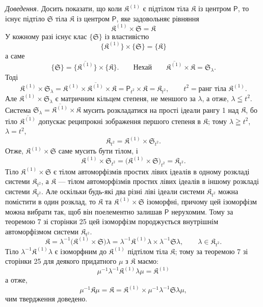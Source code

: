 \documentclass[11pt]{article}
\begin{document}
\emph{Доведення.} Досить показати, що коли \(\mathfrak K^{(1)}\) є підтілом тіла \(\mathfrak K\) із центром \(\mathsf P\), то існує підтіло \(\mathfrak S\) тіла \(\mathfrak K\) із центром \(\mathsf P\), яке задовольняє рівняння
\[
\mathfrak K^{(1)}\times\mathfrak S=\mathfrak K
\]
У кожному разі існує клас \(\{\mathfrak S\}\) із властивістю
\[
\{\mathfrak K^{(1)}\}\times\{\mathfrak S\}=\{\mathfrak K\}
\]
а саме
\[
\{\mathfrak S\}=\{\overline{\mathfrak K^{(1)}}\}\times\{\mathfrak K\}.
\qquad
\text{Нехай}\qquad
\overline{\mathfrak K^{(1)}}\times\mathfrak K=\mathfrak S_\lambda.
\]
Тоді
\[
\mathfrak K^{(1)}\times\mathfrak S_\lambda
=\mathfrak K^{(1)}\times\overline{\mathfrak K^{(1)}}\times\mathfrak K
=\mathsf P_{t^2}\times\mathfrak K
=\mathfrak K_{t^2},
\qquad
t^2=\text{ранг тіла }\mathfrak K^{(1)}.
\]
Але \(\mathfrak K^{(1)}\times\mathfrak S_\lambda\) є матричним кільцем степеня, не меншого за \(\lambda\), а отже, \(\lambda\leqq t^2\). Система \(\mathfrak S_\lambda=\overline{\mathfrak K^{(1)}}\times\mathfrak K\) мусить розкладатися на прості ідеали рангу 1 над \(\mathfrak K\), бо тіло \(\overline{\mathfrak K^{(1)}}\) допускає реципрокні зображення першого степеня в \(\mathfrak K\); тому \(\lambda\geqq t^2\), \(\lambda=t^2\),
\[
\mathfrak K_{t^2}=\mathfrak K^{(1)}\times\mathfrak S_{t^2}.
\]
Отже, \(\mathfrak K^{(1)}\times\mathfrak S\) саме мусить бути тілом, і
\[
\mathfrak K^{(1)}\times\mathfrak S_{t^2}
=\bigl(\mathfrak K^{(1)}\times\mathfrak S\bigr)_{t^2}
=\mathfrak K_{t^2}.
\]
Тіло \(\mathfrak K^{(1)}\times\mathfrak S\) є тілом автоморфізмів простих лівих ідеалів в одному розкладі системи \(\mathfrak K_{t^2}\), а \(\mathfrak K\) --- тілом автоморфізмів простих лівих ідеалів в іншому розкладі системи \(\mathfrak K_{t^2}\). Але оскільки будь-які два різні ліві ідеали системи \(\mathfrak K_{t^2}\) можна помістити в один розклад, то \(\mathfrak K\) та \(\mathfrak K^{(1)}\times\mathfrak S\) ізоморфні, причому цей ізоморфізм можна вибрати так, щоб він поелементно залишав \(\mathsf P\) нерухомим. Тому за теоремою 7 зі сторінки 25 цей ізоморфізм породжується внутрішнім автоморфізмом системи \(\mathfrak K_{t^2}\).
\[
\mathfrak K
=\lambda^{-1}\bigl(\mathfrak K^{(1)}\times\mathfrak S\bigr)\lambda
=\lambda^{-1}\mathfrak K^{(1)}\lambda\times\lambda^{-1}\mathfrak S\lambda,
\qquad
\lambda\in\mathfrak K_{t^2}.
\]
Тіло \(\lambda^{-1}\mathfrak K^{(1)}\lambda\) є ізоморфним до \(\mathfrak K^{(1)}\) підтілом тіла \(\mathfrak K\); тому за теоремою 7 зі сторінки 25 для деякого придатного \(\mu\) з \(\mathfrak K\) маємо:
\[
\mu^{-1}\lambda^{-1}\mathfrak K^{(1)}\lambda\mu=\mathfrak K^{(1)}
\]
а отже,
\[
\mu^{-1}\mathfrak K\mu
=\mathfrak K
=\mathfrak K^{(1)}\times\mu^{-1}\lambda^{-1}\mathfrak S\lambda\mu,
\]
чим твердження доведено.
\end{document}
